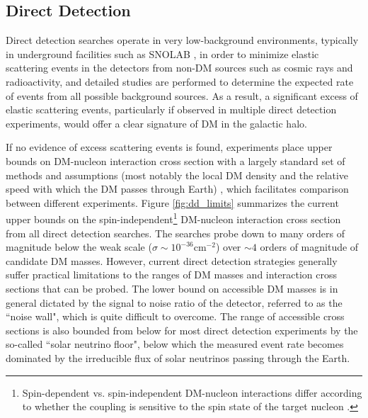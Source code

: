 \subsection{Direct Detection}

Direct detection searches operate in very low-background environments, typically in underground facilities such as SNOLAB \cite{Lawson_2020}, in order to minimize elastic scattering events in the detectors from non-DM sources such as cosmic rays and radioactivity, and detailed studies are performed to determine the expected rate of events from all possible background sources. As a result, a significant excess of elastic scattering events, particularly if observed in multiple direct detection experiments, would offer a clear signature of DM in the galactic halo. 

If no evidence of excess scattering events is found, experiments place upper bounds on DM-nucleon interaction cross section with a largely standard set of methods and assumptions (most notably the local DM density and the relative speed with which the DM passes through Earth) \cite{dd_results_standards_2021}, which facilitates comparison between different experiments. Figure \ref{fig:dd_limits} summarizes the current upper bounds on the spin-independent\footnote{Spin-dependent vs. spin-independent DM-nucleon interactions differ according to whether the coupling is sensitive to the spin state of the target nucleon \cite{billard2021direct}.} DM-nucleon interaction cross section from all direct detection searches. The searches probe down to many orders of magnitude below the weak scale (\(\sigma\sim10^{-36}\)cm\(^{-2}\)) over \(\sim4\) orders of magnitude of candidate DM masses. However, current direct detection strategies generally suffer practical limitations to the ranges of DM masses and interaction cross sections that can be probed. The lower bound on accessible DM masses is in general dictated by the signal to noise ratio of the detector, referred to as the ``noise wall", which is quite difficult to overcome. The range of accessible cross sections is also bounded from below for most direct detection experiments by the so-called ``solar neutrino floor", below which the measured event rate becomes dominated by the irreducible flux of solar neutrinos passing through the Earth. 

